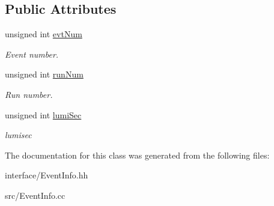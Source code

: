 \subsection*{Public Attributes}
\begin{DoxyCompactItemize}
\item 
\hypertarget{classran_1_1EventInfo_a49143c41c768684f24f10d210d727524}{unsigned int \hyperlink{classran_1_1EventInfo_a49143c41c768684f24f10d210d727524}{evt\-Num}}\label{classran_1_1EventInfo_a49143c41c768684f24f10d210d727524}

\begin{DoxyCompactList}\small\item\em Event number. \end{DoxyCompactList}\item 
\hypertarget{classran_1_1EventInfo_ab68aab06dc922ba7044ec3195de5b7d3}{unsigned int \hyperlink{classran_1_1EventInfo_ab68aab06dc922ba7044ec3195de5b7d3}{run\-Num}}\label{classran_1_1EventInfo_ab68aab06dc922ba7044ec3195de5b7d3}

\begin{DoxyCompactList}\small\item\em Run number. \end{DoxyCompactList}\item 
\hypertarget{classran_1_1EventInfo_a76b1e0e67f2b8c1143a6b85ec63ba3a0}{unsigned int \hyperlink{classran_1_1EventInfo_a76b1e0e67f2b8c1143a6b85ec63ba3a0}{lumi\-Sec}}\label{classran_1_1EventInfo_a76b1e0e67f2b8c1143a6b85ec63ba3a0}

\begin{DoxyCompactList}\small\item\em lumisec \end{DoxyCompactList}\end{DoxyCompactItemize}


The documentation for this class was generated from the following files\-:\begin{DoxyCompactItemize}
\item 
interface/Event\-Info.\-hh\item 
src/Event\-Info.\-cc\end{DoxyCompactItemize}
